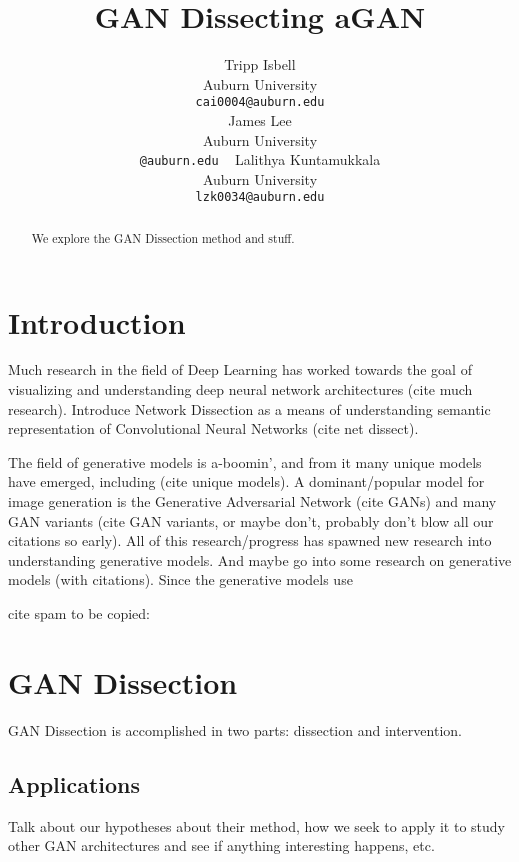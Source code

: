 \documentclass{article}
\title{GAN Dissecting aGAN}
\author{%
  Tripp Isbell\\
  Auburn University\\
  \texttt{cai0004@auburn.edu} \\
  \And
  James Lee\\
  Auburn University\\
  \texttt{@auburn.edu} \
  \And
  Lalithya Kuntamukkala\\
  Auburn University\\
  \texttt{lzk0034@auburn.edu} \\
}
\begin{document}
\maketitle

\begin{abstract}
We explore the GAN Dissection method and stuff.
\end{abstract}

\section{Introduction}


Much research in the field of Deep Learning has worked towards the goal of visualizing and understanding deep neural network architectures (cite much research). Introduce Network Dissection as a means of understanding semantic representation of Convolutional Neural Networks (cite net dissect). 

The field of generative models is a-boomin', and from it many unique models have emerged, including (cite unique models). A dominant/popular model for image generation is the Generative Adversarial Network (cite GANs) and many GAN variants (cite GAN variants, or maybe don't, probably don't blow all our citations so early). All of this research/progress has spawned new research into understanding generative models. And maybe go into some research on generative models (with citations). Since the generative models use 

cite spam to be copied:
\citet{netdissect2017}
\cite{netdissect2017}
\citet{gandissect2019}
\cite{gandissect2019}
\citet{progan2017}
\cite{progan2017}
\citet{stylegan2018}
\cite{stylegan2018}
\citet{gan2014}
\cite{gan2014}
\citet{synthesizing2016}
\cite{synthesizing2016}
\citet{deepvis2015}
\cite{deepvis2015}

\section{GAN Dissection}

GAN Dissection is accomplished in two parts: dissection and intervention. 

\subsection{Applications}


Talk about our hypotheses about their method, how we seek to apply it to study other GAN architectures and see if anything interesting happens, etc.
\end{document}
